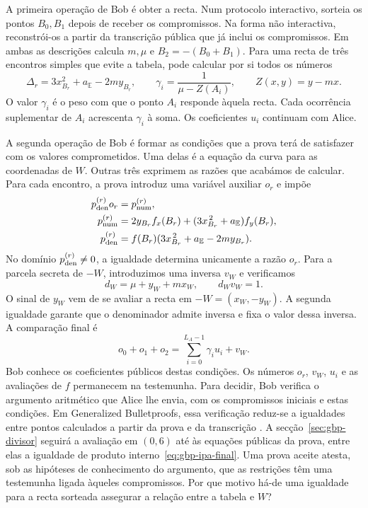 A primeira operação de Bob é obter a recta. Num protocolo
interactivo, sorteia os pontos \(B_0,B_1\) depois de receber os
compromissos. Na forma não interactiva, reconstrói-os a partir da
transcrição pública que já inclui os compromissos. Em ambas as descrições calcula
\(m,\mu\) e \(B_2=-(B_0+B_1)\). Para uma recta de três encontros
simples que evite a tabela, pode calcular por si todos os números
\[
 \Delta_r=3x_{B_r}^2+a_{\mathbb E}-2my_{B_r},
 \qquad \gamma_i=\frac1{\mu-Z(A_i)},
 \qquad Z(x,y)=y-mx .
\]
O valor \(\gamma_i\) é o peso com que o ponto \(A_i\) responde
àquela recta. Cada ocorrência suplementar de \(A_i\) acrescenta
\(\gamma_i\) à soma. Os coeficientes \(u_i\) continuam com Alice.

A segunda operação de Bob é formar as condições que a prova terá
de satisfazer com os valores comprometidos. Uma delas é a equação
da curva para as coordenadas de \(W\). Outras três exprimem as
razões que acabámos de calcular. Para cada encontro, a prova introduz
uma variável auxiliar \(o_r\) e impõe
\begin{align}
 p_{\rm den}^{(r)}o_r&=p_{\rm num}^{(r)},\nonumber\\
 p_{\rm num}^{(r)}&=2y_{B_r}f_x(B_r)
 +(3x_{B_r}^{\,2}+a_{\mathbb E})f_y(B_r),\nonumber\\
 p_{\rm den}^{(r)}&=f(B_r)
 (3x_{B_r}^{\,2}+a_{\mathbb E}
                  -2my_{B_r}).
 \label{eq:fcmp-divisor-cross-multiplication}
\end{align}
No domínio \(p_{\rm den}^{(r)}\ne0\), a igualdade determina
unicamente a razão \(o_r\). Para a parcela secreta de \(-W\),
introduzimos uma inversa \(v_W\) e verificamos
\begin{equation}
 d_W=\mu+y_W+mx_W,
 \qquad d_Wv_W=1.
 \label{eq:fcmp-output-denominator-inverse}
\end{equation}
O sinal de \(y_W\) vem de se avaliar a recta em \(-W=(x_W,-y_W)\).
A segunda igualdade garante que o denominador admite inversa e fixa
o valor dessa inversa. A comparação final é
\begin{equation}
 o_0+o_1+o_2=\sum_{i=0}^{L_A-1}\gamma_i u_i+v_W.
 \label{eq:divisors-final-linear-check}
\end{equation}
Bob conhece os coeficientes públicos destas condições. Os números
\(o_r\), \(v_W\), \(u_i\) e as avaliações de \(f\) permanecem
na testemunha. Para decidir, Bob verifica o argumento aritmético
que Alice lhe envia, com os compromissos iniciais e estas condições.
Em Generalized Bulletproofs, essa verificação reduz-se a igualdades
entre pontos calculados a partir da prova e da transcrição
\cite{generalized-bulletproofs-fixed,monero-oxide-fcmp-source}.
A secção~\ref{sec:gbp-divisor} seguirá a avaliação em \((0,6)\)
até às equações públicas da prova, entre elas a igualdade de produto
interno~\eqref{eq:gbp-ipa-final}. Uma prova aceite atesta, sob as
hipóteses de conhecimento do argumento, que as restrições têm uma
testemunha ligada àqueles compromissos.
Por que motivo há-de uma igualdade para a recta sorteada assegurar
a relação entre a tabela e \(W\)?

